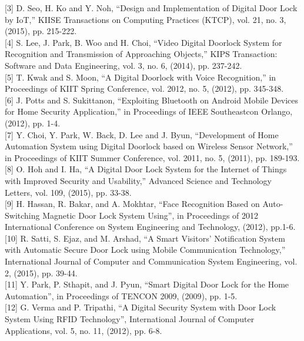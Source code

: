 \documentclass[twoside,a4paper,16pt]{book}
\begin{document}
{{			{[3]}	D.  Seo,  H.  Ko  and  Y.  Noh,  “Design  and  Implementation  of  Digital  Door  Lock  by  IoT,”  KIISE Transactions on Computing Practices (KTCP), vol. 21, no. 3, (2015), pp. 215-222.\\
			
			[4]	S. Lee, J. Park, B. Woo and H. Choi, “Video Digital Doorlock System for Recognition and Transmission of Approaching Objects,” KIPS Transaction: Software and Data Engineering, vol. 3, no. 6, (2014), pp. 237-242.\\
			
			[5]	T. Kwak and S. Moon, “A Digital Doorlock with Voice Recognition,” in Proceedings of KIIT Spring Conference, vol. 2012,  no. 5, (2012), pp. 345-348.\\
			
			[6]	J. Potts and S. Sukittanon, “Exploiting Bluetooth on Android Mobile Devices for Home Security Application,” in Proceedings of IEEE Southeastcon Orlango, (2012), pp. 1-4.\\
			
			[7]	Y. Choi, Y. Park, W. Back, D. Lee and J. Byun, “Development of Home Automation System using Digital Doorlock based on Wireless Sensor Network,” in Proceedings of KIIT Summer Conference, vol. 2011, no. 5, (2011), pp. 189-193.\\
			
			[8]	O. Hoh and I. Ha, “A Digital Door Lock System for the Internet of Things with Improved Security and Usability,” Advanced Science and Technology Letters, vol. 109, (2015), pp. 33-38.\\
			
			[9]	H. Hassan, R. Bakar, and A. Mokhtar, “Face Recognition Based on Auto-Switching Magnetic Door Lock System Using”, in Proceedings of 2012 International Conference on System Engineering and Technology, (2012), pp.1-6.\\
			
			[10] R. Satti, S. Ejaz, and M. Arshad, “A Smart Visitors’ Notification System with Automatic Secure Door Lock using Mobile Communication Technology,” International Journal of Computer and Communication System Engineering, vol. 2, (2015), pp. 39-44.\\
			
			[11] Y. Park, P. Sthapit, and J. Pyun, “Smart Digital Door Lock for the Home Automation”, in Proceedings of TENCON 2009, (2009), pp. 1-5.\\
			
			[12]	G. Verma and P. Tripathi, “A Digital Security System with Door Lock System Using RFID Technology”, International Journal of Computer Applications, vol. 5, no. 11, (2012), pp. 6-8.\\
			
}}
\end{document}
